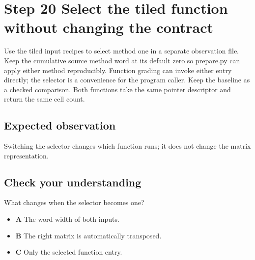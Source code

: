 \section{Step 20 Select the tiled function without changing the contract}\label{matmul-s20}

Use the tiled input recipes to select method one in a separate observation file. Keep the cumulative source method word at its default zero so prepare.py can apply either method reproducibly. Function grading can invoke either entry directly; the selector is a convenience for the program caller. Keep the baseline as a checked comparison. Both functions take the same pointer descriptor and return the same cell count.

\subsection{Expected observation}
Switching the selector changes which function runs; it does not change the matrix representation.

\subsection{Check your understanding}
What changes when the selector becomes one?

\begin{itemize}
  \item \textbf{A} The word width of both inputs.
  \item \textbf{B} The right matrix is automatically transposed.
  \item \textbf{C} Only the selected function entry.
\end{itemize}

